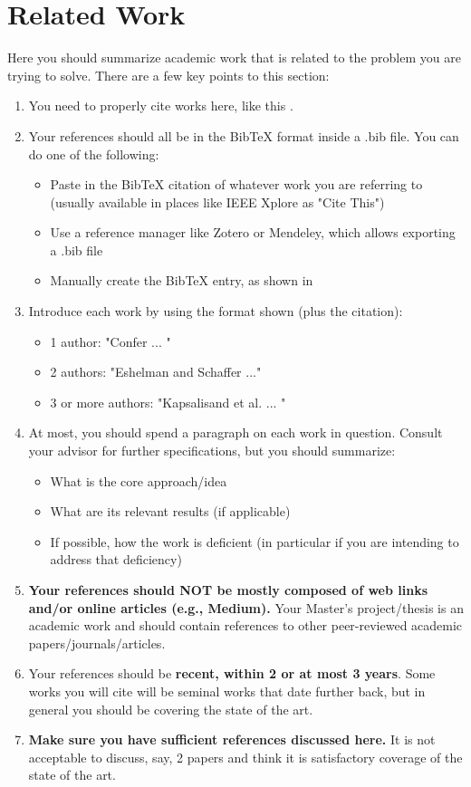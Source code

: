 \chapter{Related Work}

Here you should summarize academic work that is related to the problem you are trying to solve. There are a few key points to this section:
\begin{enumerate}
    \item You need to properly cite works here, like this \cite{confer_2005_activity}.
    \item Your references should all be in the BibTeX format inside a .bib file.  You can do one of the following:
    \begin{itemize}
        \item Paste in the BibTeX citation of whatever work you are referring to (usually available in places like IEEE Xplore as "Cite This")
        \item Use a reference manager like Zotero or Mendeley, which allows exporting a .bib file
        \item Manually create the BibTeX entry, as shown in \cite{bibtexEntries}
    \end{itemize}
    \item Introduce each work by using the format shown (plus the citation):
    \begin{itemize}
        \item 1 author: "Confer \cite{confer_2005_activity} ... "
        \item 2 authors: "Eshelman and Schaffer \cite{eshelman93real} ..."
        \item 3 or more authors: "Kapsalisand et al. \cite{kapsalis93solving} ... "
    \end{itemize}
    \item At most, you should spend a paragraph on each work in question.  Consult your advisor for further specifications, but you should summarize:
    \begin{itemize}
        \item What is the core approach/idea
        \item What are its relevant results (if applicable)
        \item If possible, how the work is deficient (in particular if you are intending to address that deficiency)
    \end{itemize}
    \item \textbf{Your references should NOT be mostly composed of web links and/or online articles (e.g., Medium).}  Your Master's project/thesis is an academic work and should contain references to other peer-reviewed academic papers/journals/articles.
    \item Your references should be \textbf{recent, within 2 or at most 3 years}.  Some works you will cite will be seminal works that date further back, but in general you should be covering the state of the art.
    \item \textbf{Make sure you have sufficient references discussed here.}  It is not acceptable to discuss, say, 2 papers and think it is satisfactory coverage of the state of the art.
\end{enumerate}

